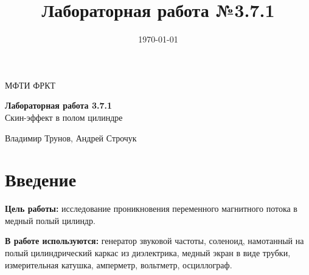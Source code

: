 \documentclass[a4paper, 12pt]{article} %
\title{Лабораторная работа №3.7.1}
\date{\today}
\begin{document}
\begin{center}
	{\large МФТИ ФРКТ}
\end{center}

{\huge
	\begin{center}
		{\bf Лабораторная работа 3.7.1}\\
		 Скин-эффект в полом цилиндре
	\end{center}
}
\begin{center}
	Владимир Трунов, Андрей Строчук
\end{center}

\section*{Введение}

\textbf{Цель работы:}
	исследование проникновения переменного магнитного потока в медный полый цилиндр.

\medskip

\textbf{В работе используются:} генератор звуковой частоты, соленоид, намотанный на полый цилиндрический каркас из диэлектрика, медный экран в виде трубки, измерительная катушка, амперметр, вольтметр, осциллограф.

\medskip
\end{document}
